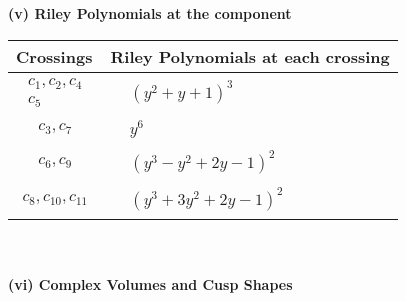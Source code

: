 \documentclass[1p]{elsarticle_modified}
\theoremstyle{definition}
\begin{document}
\newpage\renewcommand{\arraystretch}{1}
\flushleft \textbf{(v) Riley Polynomials at the component}\newline \\
\begin{tabular}{m{50pt}|m{274pt}}
Crossings & \hspace{64pt}Riley Polynomials at each crossing \\
\hline $$\begin{aligned}c_{1},c_{2},c_{4}\\c_{5}\end{aligned}$$&$\begin{aligned}
&(y^2+y+1)^3
\end{aligned}$\\
\hline $$\begin{aligned}c_{3},c_{7}\end{aligned}$$&$\begin{aligned}
&y^6
\end{aligned}$\\
\hline $$\begin{aligned}c_{6},c_{9}\end{aligned}$$&$\begin{aligned}
&(y^3- y^2+2 y-1)^2
\end{aligned}$\\
\hline $$\begin{aligned}c_{8},c_{10},c_{11}\end{aligned}$$&$\begin{aligned}
&(y^3+3 y^2+2 y-1)^2
\end{aligned}$\\
\hline
\end{tabular}\\~\\
\newpage\flushleft \textbf{(vi) Complex Volumes and Cusp Shapes}
\end{document}
